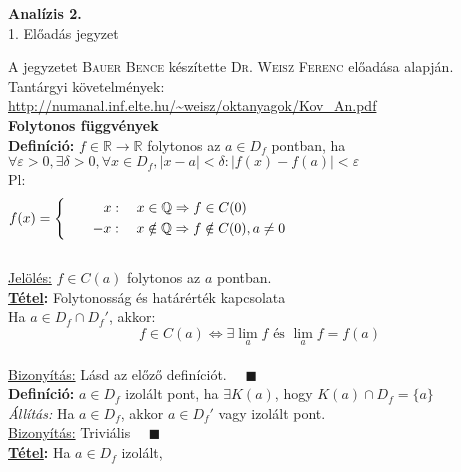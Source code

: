 \documentclass[a4paper,11pt]{article}
\begin{document}
\def\biz{\normalsize{\textbf{\underline{Bizonyítás:} }\hspace*{0.3cm}}}
\def\tetel{\large \textbf{Tétel: }}
\def\defi{\normalsize \textbf{Definíció: }}
\def\Z{\mathbb{Z}}
\def\R{\mathbb{R}}
\def\N{\mathbb{N}}
\def\Q{\mathbb{Q}}
\def\sumn{\displaystyle\sum_{n=0}^{\infty}}
\def\biz{\normalsize{\underline{Bizonyítás:} }\hspace*{0.5cm}}
\def\tetel{\normalsize \textbf{\underline{Tétel}: }}
\def\bizva{\quad\blacksquare}
\begin{center}
	{\LARGE\textbf{Analízis 2.}}\\[0.2cm]
	
	{\Large 1. Előadás jegyzet}\\[1cm]	
\end{center}
{\small A jegyzetet \textsc{Bauer Bence} készítette \textsc{Dr. Weisz Ferenc} előadása alapján.}\\[0.2cm]
Tantárgyi követelmények: \url{http://numanal.inf.elte.hu/~weisz/oktanyagok/Kov_An.pdf}\\[0.2cm]
\textbf{{\large Folytonos függvények}}\\[0.1cm]
\defi $f\in\R\to\R$ folytonos az $a\in D_f$ pontban, ha\\[0.2cm]
$\forall\varepsilon>0,\exists\delta>0,\forall x\in D_f, |x-a|<\delta:
|f(x)-f(a)|<\varepsilon$\\[0.1cm] Pl: \[\displaystyle f(x) = 
\left\{
\begin{gathered}
x: \quad x\in\Q\Rightarrow f\in C(0)\hspace{5.7cm} \\
\quad\quad-x: \quad x\notin\Q\Rightarrow f\notin C(0), a\neq 0\hspace{5.7cm}
\end{gathered}\right. \]\\[0.1cm]
\underline{Jelölés:}  $f\in C(a)$ folytonos az $a$ pontban.\\[0.2cm]
\tetel Folytonosság és határérték kapcsolata\\[0.1cm]
Ha $a\in D_f\cap D_f'$, akkor: \[ f\in C(a)\Leftrightarrow \exists\lim_a f \text{ és } \lim_a f=f(a)\]\\[0.1cm]
\biz Lásd az előző definíciót. $\quad\blacksquare$\\[0.3cm]
\defi $a\in D_f$ izolált pont, ha $\exists K(a)$, hogy $K(a)\cap D_f=\{a\}$
\\[0.1cm] \textit{Állítás:} Ha $a\in D_f$, akkor $a\in D_f'$ vagy izolált pont.
\\[0.1cm]\biz Triviális $\quad\blacksquare$\\[0.2cm] \tetel Ha $a\in D_f$ izolált, 
\end{document}
